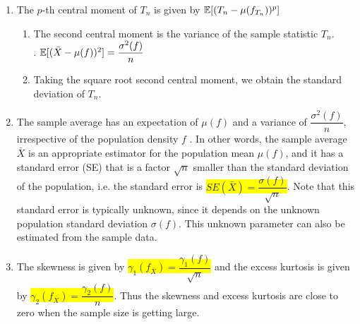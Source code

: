 \begin{enumerate}
    \item The $p$-th central moment of $T_n$ is given by $\mathbb{E}[(T_n - \mu( f _{T_n} ))^p] $
    \hfill \cite{statistics/book/Statistics-for-Data-Scientists/Maurits-Kaptein}
    \begin{enumerate}
        \item The second central moment is the variance of the sample statistic $T_n$.
        \hfill \cite{statistics/book/Statistics-for-Data-Scientists/Maurits-Kaptein}
        \\[0.2cm]
        .\hfill
        $
            \mathbb{E}[( \bar{X} - \mu( f ))^2] = \dfrac{\sigma ^2( f )}{n}
        $
        \hfill \cite{statistics/book/Statistics-for-Data-Scientists/Maurits-Kaptein}

        \item Taking the square root second central moment, we obtain the standard deviation of $T_n$.
        \hfill \cite{statistics/book/Statistics-for-Data-Scientists/Maurits-Kaptein}
    \end{enumerate}

    \item The sample average has an expectation of $\mu ( f )$ and a variance of $\dfrac{\sigma  ^2 ( f )}{n}$, irrespective of the population density $f$ .
    In other words, the sample average $\bar{X}$ is an appropriate estimator for the population mean $\mu ( f )$, and it has a standard error (SE) that is a factor $\sqrt{n}$ smaller than the standard deviation of the population, i.e. the standard error is \colorbox{yellow}{$SE( \bar{X} ) = \dfrac{\sigma  ( f )}{\sqrt{n}}$}.
    Note that this standard error is typically unknown, since it depends on the unknown population standard deviation $\sigma ( f )$.
    This unknown parameter can also be estimated from the sample data.
    \hfill \cite{statistics/book/Statistics-for-Data-Scientists/Maurits-Kaptein}

    \item The skewness is given by \colorbox{yellow}{$\gamma _1( f _{\bar{X}} ) = \dfrac{\gamma _1( f )}{\sqrt{n}}$} and
    the excess kurtosis is given by \colorbox{yellow}{$\gamma _2( f _{\bar{X}} ) = \dfrac{\gamma _2( f )}{n}$}.
    Thus the skewness and excess kurtosis are close to zero when the sample size is getting large.
    \hfill \cite{statistics/book/Statistics-for-Data-Scientists/Maurits-Kaptein}
\end{enumerate}








